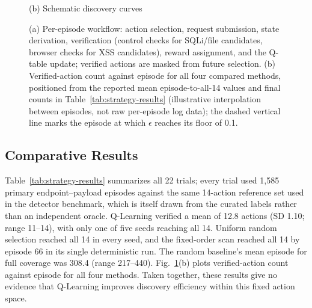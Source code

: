 \documentclass[conference, a4paper]{IEEEtran}
\begin{document}
\begin{figure}[!t]
\begin{minipage}{0.50\textwidth}
{%
}
\centerline{\scriptsize (b) Schematic discovery curves}
\end{minipage}
\caption{(a) Per-episode workflow: action selection, request
submission, state derivation, verification (control checks for
SQLi/file candidates, browser checks for XSS candidates), reward
assignment, and the Q-table update; verified actions are masked
from future selection. (b) Verified-action count against episode
for all four compared methods, positioned from the reported mean
episode-to-all-14 values and final counts in
Table~\ref{tab:strategy-results} (illustrative interpolation
between episodes, not raw per-episode log data); the dashed
vertical line marks the episode at which $\epsilon$ reaches its
floor of 0.1.}
\label{fig:combined}
\end{figure}

\subsection{Comparative Results}
\label{sec:comparative}

Table~\ref{tab:strategy-results} summarizes all 22 trials; every
trial used 1,585 primary endpoint--payload episodes against the
same 14-action reference set used in the detector benchmark, which
is itself drawn from the curated labels rather than an independent
oracle. Q-Learning verified a mean of 12.8 actions (SD 1.10; range
11--14), with only one of five seeds reaching all 14. Uniform
random selection reached all 14 in every seed, and the fixed-order
scan reached all 14 by episode 66 in its single deterministic run.
The random baseline's mean episode for full coverage was 308.4
(range 217--440). Fig.~\ref{fig:combined}(b) plots verified-action
count against episode for all four methods. Taken together, these
results give no evidence that Q-Learning improves discovery
efficiency within this fixed action space.
\end{document}
